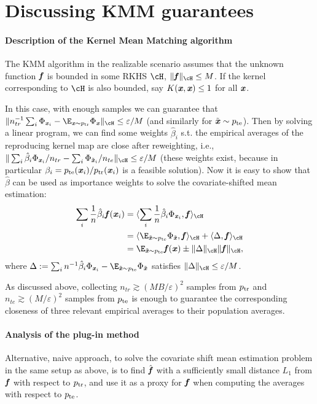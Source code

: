 \section{Discussing  KMM guarantees}\label{sec:KMMComparison}
\paragraph{Description of the Kernel Mean Matching algorithm}
The KMM algorithm in the realizable scenario assumes that the unknown function $\boldsymbol{\mathit{f}}$ is bounded in some RKHS $\cH$, $\|\ff\|_{\cH}\leq M$. If the kernel corresponding to $\cH$ is also bounded, say $K(\boldsymbol{\mathit{x}}, \boldsymbol{\mathit{x}}) \leq 1$ for all $\boldsymbol{\mathit{x}}$. 

In this case, with enough samples we can guarantee that $\|n_{tr}^{-1} \sum_i \Phi_{\xx_i} - \E_{\xx \sim \ptr} \Phi_{\xx}\|_{\cH} \leq \varepsilon/M$ (and similarly for $\tilde{\boldsymbol{\mathit{x}}} \sim p_{\mathrm{te}}$). Then by solving a linear program, we can find some weights $\hat{\beta}_i$ s.t. the empirical averages of the reproducing kernel map are close after reweighting, i.e., $\|\sum_i \hat{\beta}_i \Phi_{\xx_i}/n_{tr} - \sum_{i} \Phi_{\tilde{\xx}_i} /n_{te}\|_{\cH} \leq \varepsilon/M$ (these weights exist, because in particular $\beta_i = p_{\mathrm{te}}(\boldsymbol{\mathit{x}}_i) / p_{\mathrm{tr}}(\boldsymbol{\mathit{x}}_i)$ is a feasible solution). Now it is easy to show that $\hat{\beta}$ can be used as importance weights to solve the covariate-shifted mean estimation:
\begin{align*}
    \sum_i \frac{1}{n} \hat{\beta}_i \ff(\xx_i)&  = \langle \sum_i \frac{1}{n} \hat{\beta}_i \Phi_{\xx_i}, \ff \rangle_{\cH} \\
    & = \langle \E_{\tilde{\xx}\sim \pte} \Phi_{\tilde{\xx}} , \ff \rangle_{\cH} + \langle \Delta, \ff \rangle_{\cH} \\
    & = \E_{\tilde{\xx}\sim \pte} \ff(\xx) \pm \|\Delta\|_{\cH} \|\ff\|_{\cH},
\end{align*}
where $\Delta := \sum_i n^{-1} \hat{\beta}_i \Phi_{\xx_i} - \E_{\tilde{\xx}\sim \pte} \Phi_{\tilde{\xx}}$ satisfies $\|\Delta\|_{\cH} \leq \varepsilon / M$.

As discussed above, collecting $n_{tr} \gtrsim (MB/\varepsilon)^2$ samples from $p_{\mathrm{tr}}$ and $n_{te} \gtrsim (M/\varepsilon)^2$ samples from $p_{\mathrm{te}}$ is enough to guarantee the corresponding closeness of three relevant empirical averages to their population averages. 

\paragraph{Analysis of the plug-in method}
Alternative, naive approach, to solve the covariate shift mean estimation problem in the same setup as above, is to find $\hat{\boldsymbol{\mathit{f}}}$ with a sufficiently small distance $L_1$ from $\boldsymbol{\mathit{f}}$ with respect to $p_{\mathrm{tr}}$, and use it as a proxy for $\boldsymbol{\mathit{f}}$ when computing the averages with respect to $p_{\mathrm{te}}$. 

